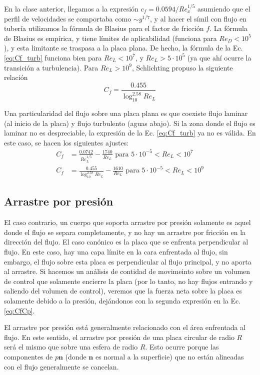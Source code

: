 En la clase anterior, llegamos a la expresión $c_f=0.0594/Re_x^{1/5}$ asumiendo que el perfil de velocidades se comportaba como $\sim y^{1/7}$, y al hacer el símil con flujo en tubería utilizamos la fórmula de Blasius para el factor de fricción $f$. 
La fórmula de Blasius es empírica, y tiene límites de aplicabilidad (funciona para $Re_D <10^5$), y esta limitante se traspasa a la placa plana.
De hecho, la fórmula de la Ec. \eqref{eq:Cf_turb} funciona bien para $Re_L<10^7$, y $Re_L>5\cdot10^5$ (ya que ahí ocurre la transición a turbulencia).
Para $Re_L>10^9$, Schlichting propuso la siguiente relación
%
\begin{equation}
C_f = \frac{0.455}{\log^{2.58}_{10}Re_L}
\end{equation}

Una particularidad del flujo sobre una placa plana es que coexiste flujo laminar (al inicio de la placa) y flujo turbulento (aguas abajo).
Si la zona donde el flujo es laminar no es despreciable, la expresión de la Ec. \eqref{eq:Cf_turb} ya no es válida. 
En este caso, se hacen los siguientes ajustes:
%
\begin{align}
C_f &= \frac{0.0742}{Re_L^{1/5}} - \frac{1740}{Re_L} \text{ para $5\cdot10^{-5}<Re_L<10^7$}\nonumber\\
C_f &= \frac{0.455}{\log^{2.58}_{10}Re_L} - \frac{1610}{Re_L} \text{ para $5\cdot10^{-5}<Re_L<10^9$}
\end{align}

\subsection*{Arrastre por presión}

El caso contrario, un cuerpo que soporta arrastre por presión solamente es aquel donde el flujo se separa completamente, y no hay un arrastre por fricción en la dirección del flujo.
El caso canónico es la placa que se enfrenta perpendicular al flujo.
En este caso, hay una capa límite en la cara enfrentada al flujo, sin embargo, el flujo sobre esta placa es perpendicular al flujo principal, y no aporta al arrastre.
Si hacemos un análisis de contidad de movimeinto sobre un volumen de control que solamente encierre la placa (por lo tanto, no hay flujos entrando y saliendo del volumen de control), veremos que la fuerza neta sobre la placa es solamente debido a la presión, dejándonos con la segunda expresión en la Ec. \eqref{eq:CfCp}.

El arrastre por presión está generalmente relacionado con el área enfrentada al flujo.
En este sentido, el arrastre por presión de una placa circular de radio $R$ será el mismo que sobre una esfera de radio $R$. 
Esto ocurre porque las componentes de $p\mathbf{n}$ (donde $\mathbf{n}$ es normal a la superficie) que no están alineadas con el flujo generalmente se cancelan.

